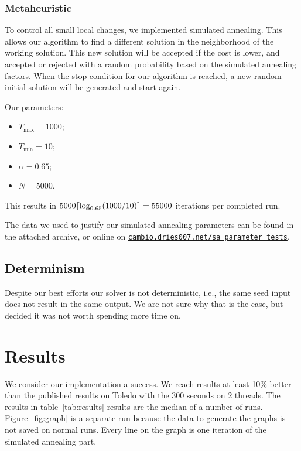 \documentclass[11pt,a4paper]{article}
\DeclarePairedDelimiter{\ceil}{\lceil}{\rceil}
\begin{document}
        \subsubsection{Metaheuristic}\label{subsec:metaheuristic}
            To control all small local changes, we implemented simulated annealing.
            This allows our algorithm to find a different solution in the neighborhood of the working solution.
            This new solution will be accepted if the cost is lower, and accepted or rejected with a random probability based on the simulated annealing factors.
            When the stop-condition for our algorithm is reached, a new random initial solution will be generated and start again.

            Our parameters:
            \begin{itemize} \itemsep-0.25em
                \item $T_{\max} = 1000$;
                \item $T_{\min} = 10$;
                \item $\alpha = 0.65$;
                \item $N = 5000$.
            \end{itemize}
            This results in $5000\ceil{\log_{0.65}(1000/10)} = 55000$ iterations per completed run.

            The data we used to justify our simulated annealing parameters can be found in the attached archive, or online on
            \href{https://cambio.dries007.net/sa_parameter_tests/}{\texttt{cambio.dries007.net/sa\_parameter\_tests}}.

    \subsection{Determinism}\label{subsec:determinism}
        Despite our best efforts our solver is not deterministic, i.e., the same seed input does not result in the same output.
        We are not sure why that is the case, but decided it was not worth spending more time on.


\section{Results}\label{sec:results}

    We consider our implementation a success.
    We reach results at least 10\% better than the published results on Toledo with the 300 seconds on 2 threads.
    The results in table~\ref{tab:results} results are the median of a number of runs.
    Figure~\ref{fig:graph} is a separate run because the data to generate the graphs is not saved on normal runs.
    Every line on the graph is one iteration of the simulated annealing part.
\end{document}
